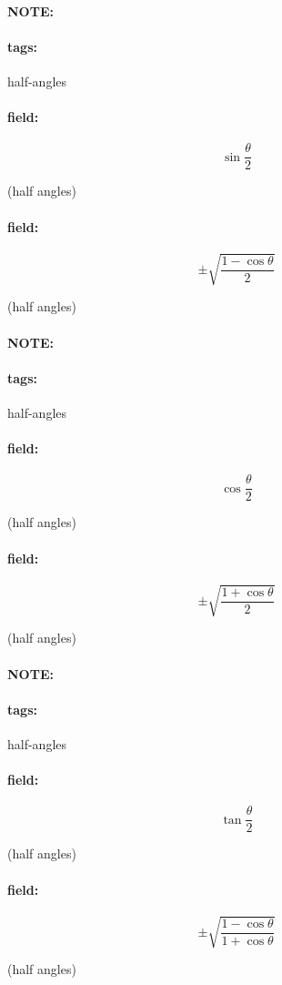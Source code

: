 \documentclass[12pt]{article}
\newenvironment{note}{\paragraph{NOTE:}}{}
\newenvironment{field}{\paragraph{field:}}{}
\newcommand*{\tags}[1]{\paragraph{tags: }#1}
\begin{document}
\begin{note}
    \tags{half-angles}
    \begin{field}
    \[  
        \sin \frac{\theta}{2}
    \] 
    \begin{center}
    (half angles)
    \end{center}
    \end{field}
    \begin{field}
    \[
        \pm \sqrt{ \frac{1 - \cos \theta }{2} } 
    \] 
    \begin{center}
    (half angles)
    \end{center}
    \end{field}
\end{note}


\begin{note}
    \tags{half-angles}
    \begin{field}
    \[  
        \cos \frac{\theta}{2}
    \] 
    \begin{center}
    (half angles)
    \end{center}
    \end{field}
    \begin{field}
    \[
        \pm \sqrt{ \frac{1 + \cos \theta }{2} } 
    \] 
    \begin{center}
    (half angles)
    \end{center}
    \end{field}
\end{note}



\begin{note}
    \tags{half-angles}
    \begin{field}
    \[  
        \tan \frac{\theta}{2}
    \] 
    \begin{center}
    (half angles)
    \end{center}
    \end{field}
    \begin{field}
    \[
        \pm \sqrt{ \frac{1 - \cos \theta }{1 + \cos \theta}} 
    \] 
    \begin{center}
    (half angles)
    \end{center}
    \end{field}
\end{note}
\end{document}
